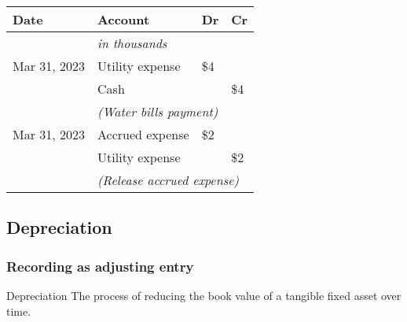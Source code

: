 \begin{tcolorbox}[colframe=black,colback=white,title=Example Adjusting Entry (Accrued Expense)]
    \vspace{1em}
    \begin{tabular}{llll}
        \textbf{Date} & \textbf{Account}                                       & \textbf{Dr} & \textbf{Cr} \\
        \hline
                      & \textit{in thousands}                                  &             &             \\
        Mar 31, 2023  & Utility expense                                        & \$4         &             \\
                      & \quad Cash                                             &             & \$4         \\
                      & \multicolumn{3}{l}{\textit{(Water bills payment)}}                                 \\
        Mar 31, 2023  & Accrued expense                                        & \$2         &             \\
                      & \quad Utility expense                                  &             & \$2         \\
                      & \multicolumn{3}{l}{\textit{(Release accrued expense)}}                             \\
    \end{tabular}
\end{tcolorbox}
\normalsize

\subsection{Depreciation}
\label{subsec:depreciation}

\subsubsection{Recording as adjusting entry}

\begin{definition}
    {Depreciation}
    The process of reducing the book value of a tangible fixed asset over time.
\end{definition}

